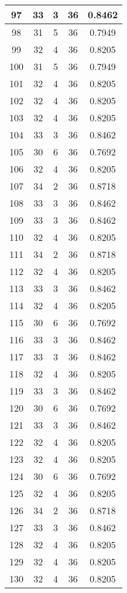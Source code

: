 \documentclass[letterpaper, 12pt]{article}
\begin{document}
\begin{longtable}{|c|c|c|c|c|}
\hline
97 & 33 & 3 & 36 & 0.8462 \\
\hline
98 & 31 & 5 & 36 & 0.7949 \\
\hline
99 & 32 & 4 & 36 & 0.8205 \\
\hline
100 & 31 & 5 & 36 & 0.7949 \\
\hline
101 & 32 & 4 & 36 & 0.8205 \\
\hline
102 & 32 & 4 & 36 & 0.8205 \\
\hline
103 & 32 & 4 & 36 & 0.8205 \\
\hline
104 & 33 & 3 & 36 & 0.8462 \\
\hline
105 & 30 & 6 & 36 & 0.7692 \\
\hline
106 & 32 & 4 & 36 & 0.8205 \\
\hline
107 & 34 & 2 & 36 & 0.8718 \\
\hline
108 & 33 & 3 & 36 & 0.8462 \\
\hline
109 & 33 & 3 & 36 & 0.8462 \\
\hline
110 & 32 & 4 & 36 & 0.8205 \\
\hline
111 & 34 & 2 & 36 & 0.8718 \\
\hline
112 & 32 & 4 & 36 & 0.8205 \\
\hline
113 & 33 & 3 & 36 & 0.8462 \\
\hline
114 & 32 & 4 & 36 & 0.8205 \\
\hline
115 & 30 & 6 & 36 & 0.7692 \\
\hline
116 & 33 & 3 & 36 & 0.8462 \\
\hline
117 & 33 & 3 & 36 & 0.8462 \\
\hline
118 & 32 & 4 & 36 & 0.8205 \\
\hline
119 & 33 & 3 & 36 & 0.8462 \\
\hline
120 & 30 & 6 & 36 & 0.7692 \\
\hline
121 & 33 & 3 & 36 & 0.8462 \\
\hline
122 & 32 & 4 & 36 & 0.8205 \\
\hline
123 & 32 & 4 & 36 & 0.8205 \\
\hline
124 & 30 & 6 & 36 & 0.7692 \\
\hline
125 & 32 & 4 & 36 & 0.8205 \\
\hline
126 & 34 & 2 & 36 & 0.8718 \\
\hline
127 & 33 & 3 & 36 & 0.8462 \\
\hline
128 & 32 & 4 & 36 & 0.8205 \\
\hline
129 & 32 & 4 & 36 & 0.8205 \\
\hline
130 & 32 & 4 & 36 & 0.8205 \\

\end{longtable}
\end{document}
